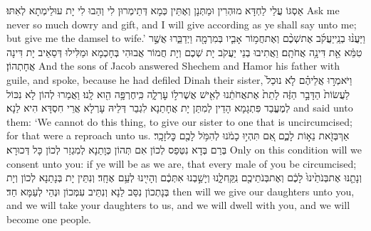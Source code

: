 {אַסְגּוֹ עֲלַי לַחְדָּא מוּהְרִין וּמַתְּנָן וְאֶתֵּין כְּמָא דְּתֵימְרוּן לִי וְהַבוּ לִי יָת עוּלֵימְתָא לְאִתּוּ׃}
{Ask me never so much dowry and gift, and I will give according as ye shall say unto me; but give me the damsel to wife.’}{}
{וַיַּעֲנ֨וּ בְנֵֽי\maqqaf יַעֲקֹ֜ב אֶת\maqqaf שְׁכֶ֨ם וְאֶת\maqqaf חֲמ֥וֹר אָבִ֛יו בְּמִרְמָ֖ה וַיְדַבֵּ֑רוּ אֲשֶׁ֣ר טִמֵּ֔א אֵ֖ת דִּינָ֥ה אֲחֹתָֽם׃}
{וַאֲתִיבוּ בְנֵי יַעֲקֹב יָת שְׁכֶם וְיָת חֲמוֹר אֲבוּהִי בְּחָכְמָא וּמַלִּילוּ דְּסַאֵיב יָת דִּינָה אֲחָתְהוֹן׃}
{And the sons of Jacob answered Shechem and Hamor his father with guile, and spoke, because he had defiled Dinah their sister,}{}
{וַיֹּאמְר֣וּ אֲלֵיהֶ֗ם לֹ֤א נוּכַל֙ לַעֲשׂוֹת֙ הַדָּבָ֣ר הַזֶּ֔ה לָתֵת֙ אֶת\maqqaf אֲחֹתֵ֔נוּ לְאִ֖ישׁ אֲשֶׁר\maqqaf ל֣וֹ עׇרְלָ֑ה כִּֽי\maqqaf חֶרְפָּ֥ה הִ֖וא לָֽנוּ׃}
{וַאֲמַרוּ לְהוֹן לָא נִכּוֹל לְמֶעֱבַד פִּתְגָמָא הָדֵין לְמִתַּן יָת אֲחָתַנָא לִגְבַר דְּלֵיהּ עָרְלָא אֲרֵי חִסְדָּא הִיא לַנָא׃}
{and said unto them: ‘We cannot do this thing, to give our sister to one that is uncircumcised; for that were a reproach unto us.}{}
{אַךְ\maqqaf בְּזֹ֖את נֵא֣וֹת לָכֶ֑ם אִ֚ם תִּהְי֣וּ כָמֹ֔נוּ לְהִמֹּ֥ל לָכֶ֖ם כׇּל\maqqaf זָכָֽר׃}
{בְּרַם בְּדָא נִטְּפַס לְכוֹן אִם תְּהוֹן כְּוָתַנָא לְמִגְזַר לְכוֹן כָּל דְּכוּרָא׃}
{Only on this condition will we consent unto you: if ye will be as we are, that every male of you be circumcised;}{}
{וְנָתַ֤נּוּ אֶת\maqqaf בְּנֹתֵ֙ינוּ֙ לָכֶ֔ם וְאֶת\maqqaf בְּנֹתֵיכֶ֖ם נִֽקַּֽח\maqqaf לָ֑נוּ וְיָשַׁ֣בְנוּ אִתְּכֶ֔ם וְהָיִ֖ינוּ לְעַ֥ם אֶחָֽד׃}
{וְנִתֵּין יָת בְּנָתַנָא לְכוֹן וְיָת בְּנָתְכוֹן נִסַּב לַנָא וְנִתֵּיב עִמְּכוֹן וּנְהֵי לְעַמָּא חַד׃}
{then will we give our daughters unto you, and we will take your daughters to us, and we will dwell with you, and we will become one people.}{}
